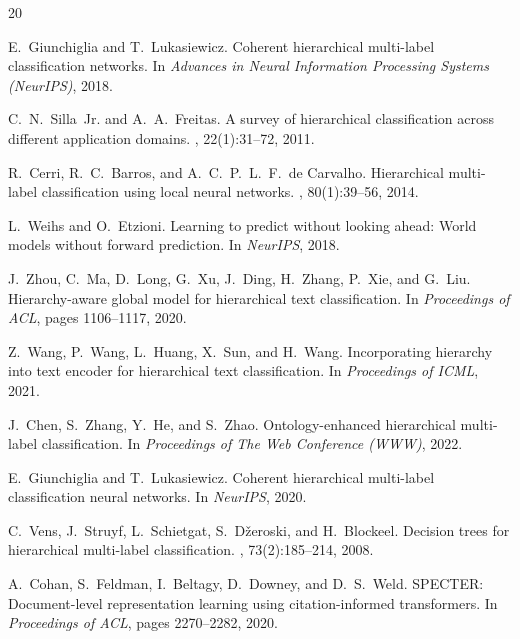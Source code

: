 \documentclass[11pt,a4paper]{article}
\begin{document}
\begin{thebibliography}{20}

E.~Giunchiglia and T.~Lukasiewicz.
\newblock Coherent hierarchical multi-label classification networks.
\newblock In {\em Advances in Neural Information Processing Systems (NeurIPS)},
  2018.

C.~N.~Silla~Jr. and A.~A.~Freitas.
\newblock A survey of hierarchical classification across different application
  domains.
, 22(1):31--72, 2011.

R.~Cerri, R.~C.~Barros, and A.~C.~P.~L.~F.~de Carvalho.
\newblock Hierarchical multi-label classification using local neural networks.
, 80(1):39--56, 2014.

L.~Weihs and O.~Etzioni.
\newblock Learning to predict without looking ahead: World models without
  forward prediction.
\newblock In {\em NeurIPS}, 2018.

J.~Zhou, C.~Ma, D.~Long, G.~Xu, J.~Ding, H.~Zhang, P.~Xie, and G.~Liu.
\newblock Hierarchy-aware global model for hierarchical text classification.
\newblock In {\em Proceedings of ACL}, pages 1106--1117, 2020.

Z.~Wang, P.~Wang, L.~Huang, X.~Sun, and H.~Wang.
\newblock Incorporating hierarchy into text encoder for hierarchical text
  classification.
\newblock In {\em Proceedings of ICML}, 2021.

J.~Chen, S.~Zhang, Y.~He, and S.~Zhao.
\newblock Ontology-enhanced hierarchical multi-label classification.
\newblock In {\em Proceedings of The Web Conference (WWW)}, 2022.

E.~Giunchiglia and T.~Lukasiewicz.
\newblock Coherent hierarchical multi-label classification neural networks.
\newblock In {\em NeurIPS}, 2020.

C.~Vens, J.~Struyf, L.~Schietgat, S.~D{\v z}eroski, and H.~Blockeel.
\newblock Decision trees for hierarchical multi-label classification.
, 73(2):185--214, 2008.

A.~Cohan, S.~Feldman, I.~Beltagy, D.~Downey, and D.~S.~Weld.
\newblock SPECTER: Document-level representation learning using
  citation-informed transformers.
\newblock In {\em Proceedings of ACL}, pages 2270--2282, 2020.

\end{thebibliography}
\end{document}
